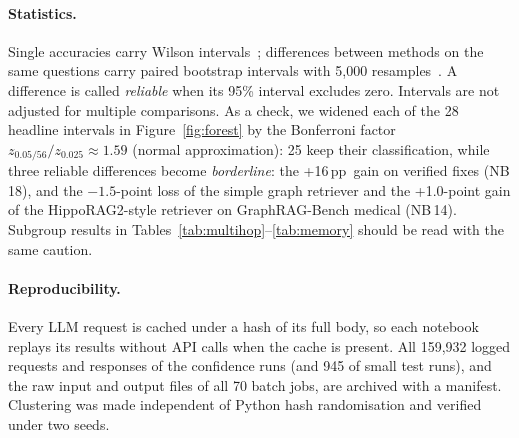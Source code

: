 \documentclass[11pt,a4paper]{article}
\newcommand{\pp}{\,pp}
\newcommand{\nb}[1]{NB\,#1}
\begin{document}
\paragraph{Statistics.} Single accuracies carry Wilson intervals~\cite{wilson1927}; differences between methods
on the same questions carry paired bootstrap intervals with 5{,}000 resamples~\cite{efron1993bootstrap}. A difference is called
\emph{reliable} when its 95\% interval excludes zero. Intervals are not adjusted for multiple comparisons. As a
check, we widened each of the 28 headline intervals in Figure~\ref{fig:forest} by the Bonferroni factor
$z_{0.05/56}/z_{0.025}\approx 1.59$ (normal approximation): 25 keep their classification, while three reliable
differences become \emph{borderline}: the +16\pp\ gain on verified fixes (\nb{18}), and the $-1.5$-point loss of the
simple graph retriever and the +1.0-point gain of the HippoRAG2-style retriever on GraphRAG-Bench medical (\nb{14}). Subgroup results in Tables~\ref{tab:multihop}--\ref{tab:memory} should be read
with the same caution.

\paragraph{Reproducibility.} Every LLM request is cached under a hash of its full body, so each notebook replays
its results without API calls when the cache is present. All 159{,}932 logged requests and responses of the confidence runs (and 945 of small
test runs), and the raw input and output files of all 70 batch jobs, are archived with a manifest. Clustering was made independent of
Python hash randomisation and verified under two seeds.
\end{document}
